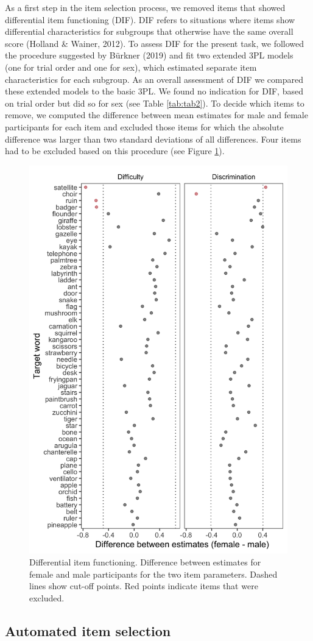\documentclass[
  man,floatsintext]{apa6}
\begin{document}
As a first step in the item selection process, we removed items that showed differential item functioning (DIF). DIF refers to situations where items show differential characteristics for subgroups that otherwise have the same overall score (Holland \& Wainer, 2012). To assess DIF for the present task, we followed the procedure suggested by Bürkner (2019) and fit two extended 3PL models (one for trial order and one for sex), which estimated separate item characteristics for each subgroup. As an overall assessment of DIF we compared these extended models to the basic 3PL. We found no indication for DIF, based on trial order but did so for sex (see Table \ref{tab:tab2}). To decide which items to remove, we computed the difference between mean estimates for male and female participants for each item and excluded those items for which the absolute difference was larger than two standard deviations of all differences. Four items had to be excluded based on this procedure (see Figure \ref{fig:fig3}).



\begin{figure}

{\centering \includegraphics[width=0.5\linewidth]{../graphs/dif_fig} 

}

\caption{Differential item functioning. Difference between estimates for female and male participants for the two item parameters. Dashed lines show cut-off points. Red points indicate items that were excluded.}\label{fig:fig3}
\end{figure}

\hypertarget{automated-item-selection}{%
\subsection{Automated item selection}\label{automated-item-selection}}
\end{document}
